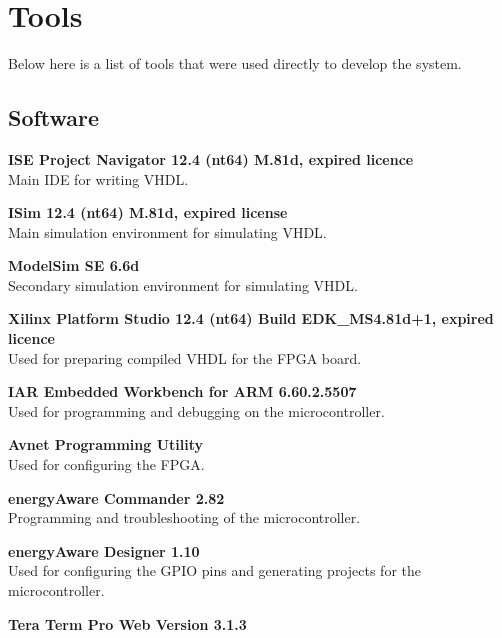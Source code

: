 \section{Tools}
Below here is a list of tools that were used directly to develop the system.


\subsection{Software}
\begin{description}
    \item{\textbf{ISE Project Navigator 12.4 (nt64) M.81d, expired licence}} \\
        Main IDE for writing VHDL.
    \item{\textbf{ISim 12.4 (nt64) M.81d, expired license}} \\
        Main simulation environment for simulating VHDL.
    \item{\textbf{ModelSim SE 6.6d}} \\
        Secondary simulation environment for simulating VHDL.
    \item{\textbf{Xilinx Platform Studio 12.4 (nt64) Build EDK\_MS4.81d+1, expired licence}} \\
        Used for preparing compiled VHDL for the FPGA board.
    \item{\textbf{IAR Embedded Workbench for ARM 6.60.2.5507}} \\
        Used for programming and debugging on the microcontroller.
    \item{\textbf{Avnet Programming Utility}} \\
        Used for configuring the FPGA.
    \item{\textbf{energyAware Commander 2.82}} \\
        Programming and troubleshooting of the microcontroller.
    \item{\textbf{energyAware Designer 1.10}} \\
        Used for configuring the GPIO pins and generating projects for the microcontroller.
    \item{\textbf{Tera Term Pro Web Version 3.1.3}} \\

\end{description}

